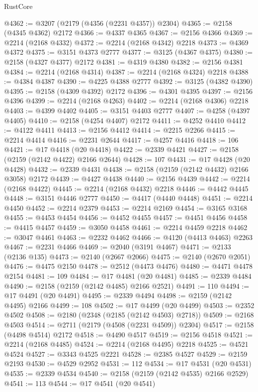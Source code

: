 \begin{lexlean}{RustCore}
\begin{coremodule}
@4362 := @3207 (@2179 (@4356 (@2231 @4357)) @2304)
@4365 := @2158 (@4345 @4362) @2172
@4366 := @4337 @4365
@4367 := @2156 @4366
@4369 := @2214 (@2168 @4332)
@4372 := @2214 (@2168 @4342) @2218
@4373 := @4369 @4372
@4375 := @3151 @4373 @2777
@4377 := @3125 (@4367 @4375)
@4380 := @2158 (@4327 @4377) @2172
@4381 := @4319 @4380
@4382 := @2156 @4381
@4384 := @2214 (@2168 @4314)
@4387 := @2214 (@2168 @4324) @2218
@4388 := @4384 @4387
@4390 := @4225 @4388 @2777
@4392 := @3125 (@4382 @4390)
@4395 := @2158 (@4309 @4392) @2172
@4396 := @4301 @4395
@4397 := @2156 @4396
@4399 := @2214 (@2168 @4263)
@4402 := @2214 (@2168 @4306) @2218
@4403 := @4399 @4402
@4405 := @3151 @4403 @2777
@4407 := @4258 (@4397 @4405)
@4410 := @2158 (@4254 @4407) @2172
@4411 := @4252 @4410
@4412 := @4122 @4411
@4413 := @2156 @4412
@4414 := @2215 @2266
@4415 := @2214 @4414
@4416 := @2231 @2644
@4417 := @4257 @4416
@4418 := 106
@4421 := @17 @4418 (@20 @4418)
@4422 := @2339 @4421
@4427 := @2158 (@2159 (@2142 @4422) @2166 @2644)
@4428 := 107
@4431 := @17 @4428 (@20 @4428)
@4432 := @2339 @4431
@4438 := @2158 (@2159 (@2142 @4432) @2166 @3058) @2172
@4439 := @4427 @4438
@4440 := @2156 @4439
@4442 := @2214 (@2168 @4422)
@4445 := @2214 (@2168 @4432) @2218
@4446 := @4442 @4445
@4448 := @3151 @4446 @2777
@4450 := @4417 (@4440 @4448)
@4451 := @2214 @4450
@4452 := @2214 @2379
@4453 := @2214 @2169
@4454 := @3165 @3168
@4455 := @4453 @4454
@4456 := @4452 @4455
@4457 := @4451 @4456
@4458 := @4415 @4457
@4459 := @3050 @4458
@4461 := @2214 @4459 @2218
@4462 := @3047 @4461
@4463 := @2232 @4462
@4466 := @4120 (@4413 @4463) @2263
@4467 := @2231 @4466
@4469 := @2040 (@3191 @4467)
@4471 := @2133 (@2136 @135)
@4473 := @2140 (@2667 @2066)
@4475 := @2140 (@2670 @2051)
@4476 := @4475 @2150
@4478 := @2512 (@4473 @4476)
@4480 := @4471 @4478 @2154
@4481 := 109
@4484 := @17 @4481 (@20 @4481)
@4485 := @2339 @4484
@4490 := @2158 (@2159 (@2142 @4485) @2166 @2521)
@4491 := 110
@4494 := @17 @4491 (@20 @4491)
@4495 := @2339 @4494
@4498 := @2159 (@2142 @4495) @2166
@4499 := 108
@4502 := @17 @4499 (@20 @4499)
@4503 := @2352 @4502
@4508 := @2180 (@2348 (@2185 (@2142 @4503) @2718))
@4509 := @2168 @4503
@4514 := @2711 (@2179 (@4508 (@2231 @4509)) @2304)
@4517 := @2158 (@4498 @4514) @2172
@4518 := @4490 @4517
@4519 := @2156 @4518
@4521 := @2214 (@2168 @4485)
@4524 := @2214 (@2168 @4495) @2218
@4525 := @4521 @4524
@4527 := @3343 @4525 @2221
@4528 := @2385 @4527
@4529 := @2159 @2193
@4530 := @4529 @2952
@4531 := 112
@4534 := @17 @4531 (@20 @4531)
@4535 := @2339 @4534
@4540 := @2158 (@2159 (@2142 @4535) @2166 @2529)
@4541 := 113
@4544 := @17 @4541 (@20 @4541)

\end{coremodule}
\end{lexlean}
